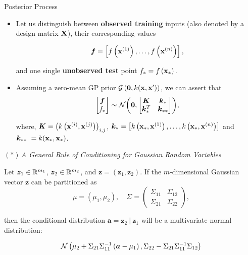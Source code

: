\begin{frame}[c,allowframebreaks]{Posterior Process}

\begin{itemize}
\item Let us distinguish between \textbf{observed training} inputs (also denoted by a design matrix $\mathbf{X}$), their corresponding values
  
$$\bm{f} = \left[f\left(\mathbf{x}^{(1)}\right),\dots, f\left(\mathbf{x}^{(n)}\right)\right],$$ 

and one single \textbf{unobserved test} point $f_* = f\left(\mathbf{x}_*\right).$

\lz

\item Assuming a zero-mean GP prior $\mathcal{G}\left(\bm{0}, k(\mathbf{x}, \mathbf{x}^\prime)\right)$, we can assert that
$$\begin{bmatrix}\bm{f} \\
f_*\end{bmatrix}\sim  
\mathcal{N}\biggl(\bm{0}, \begin{bmatrix} \bm{K} & \bm{k}_* \\ \bm{k}_*^T & \bm{k}_{**}\end{bmatrix}\biggr),$$

where, $\bm{K} = \left(k\left(\mathbf{x}^{(i)}, \mathbf{x}^{(j)}\right)\right)_{i,j}$, $\bm{k}_* = \left[k\left(\mathbf{x}_*, \mathbf{x}^{(1)}\right),\dots, k\left(\mathbf{x}_*, \mathbf{x}^{(n)}\right)\right]$ and $ \bm{k}_{**}\ = k(\x_*, \x_*)$.

\end{itemize}
\framebreak


\textit{${(*)}\,$A General Rule of Conditioning for Gaussian Random Variables}

\lz
\lz

Let $\bm{z}_1 \in \mathbb{R} ^{m_1}$, $\bm{z}_2 \in \mathbb{R}^{m_2}$, and $\bm{z} = \left(\bm{z}_1, \bm{z}_2\right)$. If the $m$-dimensional Gaussian vector $\bm{z}$ can be partitioned as $$\mu = \left(\mu_1, \mu_2\right), \quad \Sigma = \begin{pmatrix} \Sigma_{11} & \Sigma_{12} \\ \Sigma_{21} & \Sigma_{22} \end{pmatrix},$$

then the conditional distribution $\bm{a}= \bm{z}_2 ~|~ \bm{z}_1$ will be a multivariate normal distribution:

$$
\mathcal{N}\left(\mu_2 + \Sigma_{21} \Sigma_{11}^{-1}\left(\bm{a} - \mu_1\right), \Sigma_{22} - \Sigma_{21}\Sigma_{11}^{-1}\Sigma_{12} \right)
$$



\end{frame}
